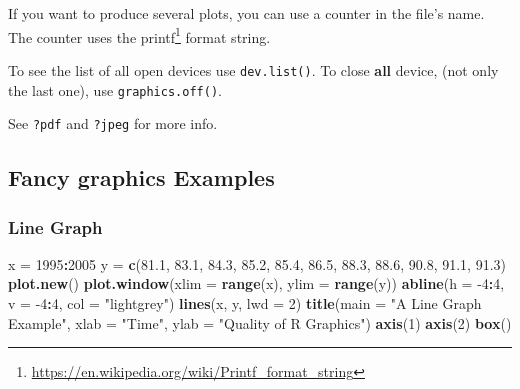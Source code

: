 \documentclass[]{book}
\newenvironment{Shaded}{\begin{snugshade}}{\end{snugshade}}
\newcommand{\CommentTok}[1]{\textcolor[rgb]{0.56,0.35,0.01}{\textit{#1}}}
\newcommand{\DataTypeTok}[1]{\textcolor[rgb]{0.13,0.29,0.53}{#1}}
\newcommand{\DecValTok}[1]{\textcolor[rgb]{0.00,0.00,0.81}{#1}}
\newcommand{\FloatTok}[1]{\textcolor[rgb]{0.00,0.00,0.81}{#1}}
\newcommand{\KeywordTok}[1]{\textcolor[rgb]{0.13,0.29,0.53}{\textbf{#1}}}
\newcommand{\NormalTok}[1]{#1}
\newcommand{\OperatorTok}[1]{\textcolor[rgb]{0.81,0.36,0.00}{\textbf{#1}}}
\newcommand{\StringTok}[1]{\textcolor[rgb]{0.31,0.60,0.02}{#1}}
\renewcommand{\href}[2]{#2\footnote{\url{#1}}}
\theoremstyle{definition}
\theoremstyle{definition}
\theoremstyle{definition}
\theoremstyle{remark}
\begin{document}
If you want to produce several plots, you can use a counter in the file's name. The counter uses the \href{https://en.wikipedia.org/wiki/Printf_format_string}{printf} format string.

\begin{Shaded}
\end{Shaded}

To see the list of all open devices use \texttt{dev.list()}.
To close \textbf{all} device, (not only the last one), use \texttt{graphics.off()}.

See \texttt{?pdf} and \texttt{?jpeg} for more info.

\hypertarget{fancy}{%
\subsection{Fancy graphics Examples}\label{fancy}}

\hypertarget{line-graph}{%
\subsubsection{Line Graph}\label{line-graph}}

\begin{Shaded}
\begin{Highlighting}[]
\NormalTok{x =}\StringTok{ }\DecValTok{1995}\OperatorTok{:}\DecValTok{2005}
\NormalTok{y =}\StringTok{ }\KeywordTok{c}\NormalTok{(}\FloatTok{81.1}\NormalTok{, }\FloatTok{83.1}\NormalTok{, }\FloatTok{84.3}\NormalTok{, }\FloatTok{85.2}\NormalTok{, }\FloatTok{85.4}\NormalTok{, }\FloatTok{86.5}\NormalTok{, }\FloatTok{88.3}\NormalTok{, }\FloatTok{88.6}\NormalTok{, }\FloatTok{90.8}\NormalTok{, }\FloatTok{91.1}\NormalTok{, }\FloatTok{91.3}\NormalTok{)}
\KeywordTok{plot.new}\NormalTok{()}
\KeywordTok{plot.window}\NormalTok{(}\DataTypeTok{xlim =} \KeywordTok{range}\NormalTok{(x), }\DataTypeTok{ylim =} \KeywordTok{range}\NormalTok{(y))}
\KeywordTok{abline}\NormalTok{(}\DataTypeTok{h =} \DecValTok{-4}\OperatorTok{:}\DecValTok{4}\NormalTok{, }\DataTypeTok{v =} \DecValTok{-4}\OperatorTok{:}\DecValTok{4}\NormalTok{, }\DataTypeTok{col =} \StringTok{"lightgrey"}\NormalTok{)}
\KeywordTok{lines}\NormalTok{(x, y, }\DataTypeTok{lwd =} \DecValTok{2}\NormalTok{)}
\KeywordTok{title}\NormalTok{(}\DataTypeTok{main =} \StringTok{"A Line Graph Example"}\NormalTok{,}
        \DataTypeTok{xlab =} \StringTok{"Time"}\NormalTok{,}
        \DataTypeTok{ylab =} \StringTok{"Quality of R Graphics"}\NormalTok{)}
\KeywordTok{axis}\NormalTok{(}\DecValTok{1}\NormalTok{)}
\KeywordTok{axis}\NormalTok{(}\DecValTok{2}\NormalTok{)}
\KeywordTok{box}\NormalTok{()}
\end{Highlighting}
\end{Shaded}
\end{document}
